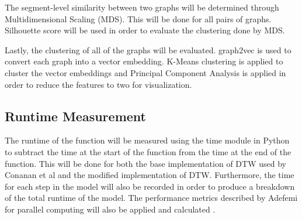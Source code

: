 The segment-level similarity between two graphs will be determined through Multidimensional Scaling (MDS). This will be done for all pairs of graphs. Silhouette score will be used in order to evaluate the clustering done by MDS.

Lastly, the clustering of all of the graphs will be evaluated. graph2vec is used  to convert each graph into a vector embedding. K-Means clustering is applied to cluster the vector embeddings and Principal Component Analysis is applied in order to reduce the features to two for visualization.

\subsection{Runtime Measurement}
The runtime of the function will be measured using the time module in Python to subtract the time at the start of the function from the time at the end of the function. This will be done for both the base implementation of DTW used by Conanan et al and the modified implementation of DTW. Furthermore, the time for each step in the model will also be recorded in order to produce a breakdown of the total runtime of the model. The performance metrics described by Adefemi for parallel computing will also be applied and calculated \cite{AdefemiParallelization}.